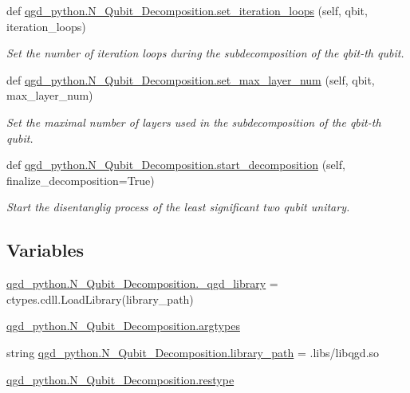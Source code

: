\begin{DoxyCompactItemize}
def \hyperlink{group__python_ga5c703393d528f31a2d1aa2cc7282c691}{qgd\+\_\+python.\+N\+\_\+\+Qubit\+\_\+\+Decomposition.\+set\+\_\+iteration\+\_\+loops} (self, qbit, iteration\+\_\+loops)
\begin{DoxyCompactList}\small\item\em Set the number of iteration loops during the subdecomposition of the qbit-\/th qubit. \end{DoxyCompactList}\item 
def \hyperlink{group__python_ga194ae83da0f906220e3b001d1bac14bc}{qgd\+\_\+python.\+N\+\_\+\+Qubit\+\_\+\+Decomposition.\+set\+\_\+max\+\_\+layer\+\_\+num} (self, qbit, max\+\_\+layer\+\_\+num)
\begin{DoxyCompactList}\small\item\em Set the maximal number of layers used in the subdecomposition of the qbit-\/th qubit. \end{DoxyCompactList}\item 
def \hyperlink{group__python_ga0001a3a473bd31784f1da0d018a7529a}{qgd\+\_\+python.\+N\+\_\+\+Qubit\+\_\+\+Decomposition.\+start\+\_\+decomposition} (self, finalize\+\_\+decomposition=True)
\begin{DoxyCompactList}\small\item\em Start the disentanglig process of the least significant two qubit unitary. \end{DoxyCompactList}\end{DoxyCompactItemize}
\subsection*{Variables}
\begin{DoxyCompactItemize}
\item 
\hyperlink{group__python_gaab3ee0c640088387c37d0bea14b0bbd0}{qgd\+\_\+python.\+N\+\_\+\+Qubit\+\_\+\+Decomposition.\+\_\+qgd\+\_\+library} = ctypes.\+cdll.\+Load\+Library(library\+\_\+path)
\item 
\hyperlink{group__python_gacb3a3a21bbd6fbe8c612122ea586f1e9}{qgd\+\_\+python.\+N\+\_\+\+Qubit\+\_\+\+Decomposition.\+argtypes}
\item 
string \hyperlink{group__python_ga36e466ce872adb198d01ce19abdd3177}{qgd\+\_\+python.\+N\+\_\+\+Qubit\+\_\+\+Decomposition.\+library\+\_\+path} = \textquotesingle{}.libs/libqgd.\+so\textquotesingle{}
\item 
\hyperlink{group__python_ga9341b826d33e46599c99a2da15e9c2be}{qgd\+\_\+python.\+N\+\_\+\+Qubit\+\_\+\+Decomposition.\+restype}
\end{DoxyCompactItemize}


